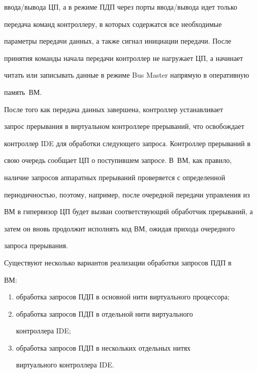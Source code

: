 ввода/вывода ЦП, а в режиме ПДП через порты ввода/\!вывода идет только 


передача команд контроллеру, в которых содержатся все необходимые 


параметры передачи данных, а также сигнал инициации передачи. После 


принятия команды начала передачи контроллер не нагружает ЦП, а начинает 


читать или записывать данные в режиме Bus Master напрямую в оперативную 


память~ВМ. 


     


     После того как передача данных завершена, контроллер устанавливает 


запрос прерывания в виртуальном контроллере прерываний, что освобождает 


контроллер IDE для обработки следующего запроса. Контроллер прерываний в 


свою очередь сообщает ЦП о поступившем запросе. В~ВМ, как правило, 


наличие запросов аппаратных прерываний проверяется с определенной 


периодичностью, поэтому, например, после очередной передачи управления из 


ВМ в гипервизор ЦП будет вызван соответствующий обработчик прерываний, а 


затем он вновь продолжит исполнять код ВМ, ожидая прихода очередного 


запроса прерывания.


     


     Существуют несколько вариантов реализации обработки запросов ПДП в 


ВМ:


     \begin{enumerate}[(1)]


\item обработка запросов ПДП в основной нити виртуального процессора;


\item обработка запросов ПДП в отдельной нити виртуального 


контроллера IDE;


\item обработка запросов ПДП в нескольких отдельных нитях 


виртуального контроллера IDE.


\end{enumerate}





